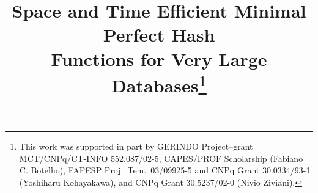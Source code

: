%
%
%
%
%
%
\documentclass[twocolumn,fleqn,runningheads]{svjour2}
%
\smartqed  %
%
\usepackage{graphicx}
\usepackage{listings}
\usepackage{epsfig}
\usepackage{textcomp}
\usepackage[latin1]{inputenc}
\usepackage{amssymb}

%
%
%
%


\def\cG{{\mathcal G}}
\def\crit{{\rm crit}}
\def\ncrit{{\rm ncrit}}
\def\scrit{{\rm scrit}}
\def\bedges{{\rm bedges}}
\def\ZZ{{\mathbb Z}}

%



\title{Space and Time Efficient Minimal Perfect Hash \\[0.2cm]
Functions for Very Large Databases\thanks{
This work was supported in part by
GERINDO Project--grant MCT/CNPq/CT-INFO 552.087/02-5,
CAPES/PROF Scholarship (Fabiano C. Botelho),
FAPESP Proj.\ Tem.\ 03/09925-5 and CNPq Grant 30.0334/93-1
(Yoshiharu Kohayakawa),
and CNPq Grant 30.5237/02-0 (Nivio Ziviani).}
}

